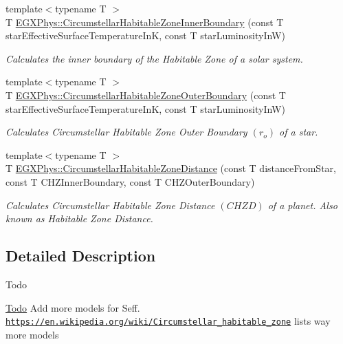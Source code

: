 \begin{DoxyCompactItemize}
{\footnotesize template$<$typename T $>$ }\\T \mbox{\hyperlink{group___e_g_x_phys-_circumstellar_habitable_zone_limit_gab31a33d0dbd3ecd00537832b5b836d73}{E\+G\+X\+Phys\+::\+Circumstellar\+Habitable\+Zone\+Inner\+Boundary}} (const T star\+Effective\+Surface\+Temperature\+InK, const T star\+Luminosity\+InW)
\begin{DoxyCompactList}\small\item\em Calculates the inner boundary of the Habitable Zone of a solar system. \end{DoxyCompactList}\item 
{\footnotesize template$<$typename T $>$ }\\T \mbox{\hyperlink{group___e_g_x_phys-_circumstellar_habitable_zone_limit_ga3a6dbbdaddddd071cb1f0a20e40d83bd}{E\+G\+X\+Phys\+::\+Circumstellar\+Habitable\+Zone\+Outer\+Boundary}} (const T star\+Effective\+Surface\+Temperature\+InK, const T star\+Luminosity\+InW)
\begin{DoxyCompactList}\small\item\em Calculates Circumstellar Habitable Zone Outer Boundary $(r_o)$ of a star. \end{DoxyCompactList}\item 
{\footnotesize template$<$typename T $>$ }\\T \mbox{\hyperlink{group___e_g_x_phys-_circumstellar_habitable_zone_limit_gaf289fb8f037ece66d850f7d827f83752}{E\+G\+X\+Phys\+::\+Circumstellar\+Habitable\+Zone\+Distance}} (const T distance\+From\+Star, const T C\+H\+Z\+Inner\+Boundary, const T C\+H\+Z\+Outer\+Boundary)
\begin{DoxyCompactList}\small\item\em Calculates Circumstellar Habitable Zone Distance $(CHZD)$ of a planet. Also known as Habitable Zone Distance. \end{DoxyCompactList}\end{DoxyCompactItemize}


\subsection{Detailed Description}
\begin{DoxyRefDesc}{Todo}
\item[\mbox{\hyperlink{todo__todo000001}{Todo}}]Add more models for Seff. \href{https://en.wikipedia.org/wiki/Circumstellar_habitable_zone}{\tt https\+://en.\+wikipedia.\+org/wiki/\+Circumstellar\+\_\+habitable\+\_\+zone} lists way more models \end{DoxyRefDesc}


